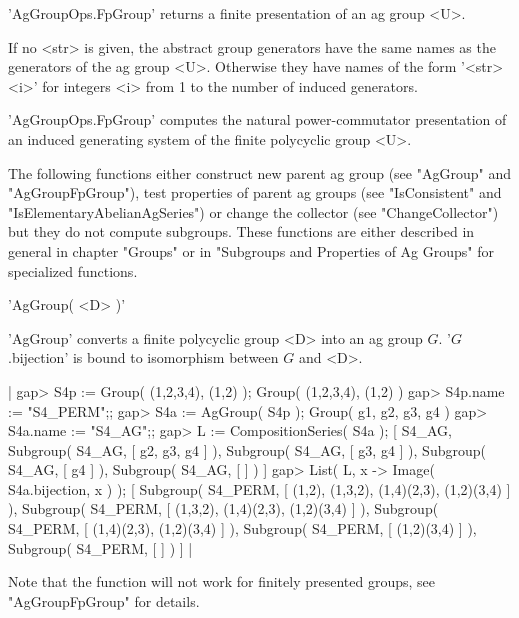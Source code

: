 'AgGroupOps.FpGroup'  returns  a finite presentation of an ag group  <U>.

If no <str> is given, the abstract group  generators  have the same names
as the generators of the ag group <U>.  Otherwise they  have names of the
form  '<str><i>'  for   integers  <i> from  1 to  the   number of induced
generators.

'AgGroupOps.FpGroup' computes   the natural power-commutator presentation
of an induced generating system of the finite polycyclic group <U>.



The following functions  either   construct  new  parent ag   group  (see
"AgGroup" and "AgGroupFpGroup"), test properties of parent ag groups (see
"IsConsistent" and "IsElementaryAbelianAgSeries") or change the collector
(see  "ChangeCollector") but they   do not   compute    subgroups.  These
functions are  either  described  in  general in  chapter  "Groups" or in
"Subgroups and Properties of Ag Groups" for specialized functions.


'AgGroup( <D> )'

'AgGroup' converts a  finite polycyclic group  <D> into an  ag group $G$.
'$G$.bijection' is bound to isomorphism between $G$ and <D>.

|    gap> S4p := Group( (1,2,3,4), (1,2) );
    Group( (1,2,3,4), (1,2) )
    gap> S4p.name := "S4_PERM";;
    gap> S4a := AgGroup( S4p );
    Group( g1, g2, g3, g4 )
    gap> S4a.name := "S4_AG";;
    gap> L := CompositionSeries( S4a );
    [ S4_AG, Subgroup( S4_AG, [ g2, g3, g4 ] ),
      Subgroup( S4_AG, [ g3, g4 ] ), Subgroup( S4_AG, [ g4 ] ),
      Subgroup( S4_AG, [  ] ) ]
    gap> List( L, x -> Image( S4a.bijection, x ) );
    [ Subgroup( S4_PERM, [ (1,2), (1,3,2), (1,4)(2,3), (1,2)(3,4) ] ),
      Subgroup( S4_PERM, [ (1,3,2), (1,4)(2,3), (1,2)(3,4) ] ),
      Subgroup( S4_PERM, [ (1,4)(2,3), (1,2)(3,4) ] ),
      Subgroup( S4_PERM, [ (1,2)(3,4) ] ), Subgroup( S4_PERM, [  ] ) ] |

Note that the  function  will not work for finitely presented groups, see
"AgGroupFpGroup" for details.


